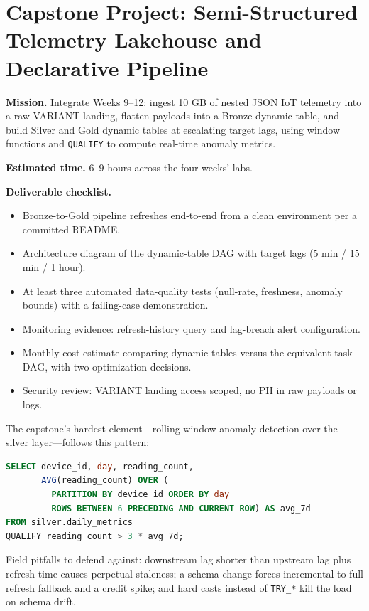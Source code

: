 \section{Capstone Project: Semi-Structured Telemetry Lakehouse and Declarative Pipeline}\label{sec:ch12-capstone}
\begin{capstonebox}
\textbf{Mission.} Integrate Weeks 9--12: ingest 10 GB of nested JSON IoT telemetry into a raw VARIANT landing, flatten payloads into a Bronze dynamic table, and build Silver and Gold dynamic tables at escalating target lags, using window functions and \texttt{QUALIFY} to compute real-time anomaly metrics.

\textbf{Estimated time.} 6--9 hours across the four weeks' labs.

\textbf{Deliverable checklist.}
\begin{itemize}
    \item Bronze-to-Gold pipeline refreshes end-to-end from a clean environment per a committed README.
    \item Architecture diagram of the dynamic-table DAG with target lags (5 min / 15 min / 1 hour).
    \item At least three automated data-quality tests (null-rate, freshness, anomaly bounds) with a failing-case demonstration.
    \item Monitoring evidence: refresh-history query and lag-breach alert configuration.
    \item Monthly cost estimate comparing dynamic tables versus the equivalent task DAG, with two optimization decisions.
    \item Security review: VARIANT landing access scoped, no PII in raw payloads or logs.
\end{itemize}
\end{capstonebox}

The capstone's hardest element---rolling-window anomaly detection over the silver layer---follows this pattern:

\begin{lstlisting}[language=SQL, caption={Anomaly flag via 7-day rolling average}]
SELECT device_id, day, reading_count,
       AVG(reading_count) OVER (
         PARTITION BY device_id ORDER BY day
         ROWS BETWEEN 6 PRECEDING AND CURRENT ROW) AS avg_7d
FROM silver.daily_metrics
QUALIFY reading_count > 3 * avg_7d;
\end{lstlisting}

Field pitfalls to defend against: downstream lag shorter than upstream lag plus refresh time causes perpetual staleness; a schema change forces incremental-to-full refresh fallback and a credit spike; and hard casts instead of \texttt{TRY\_*} kill the load on schema drift.

